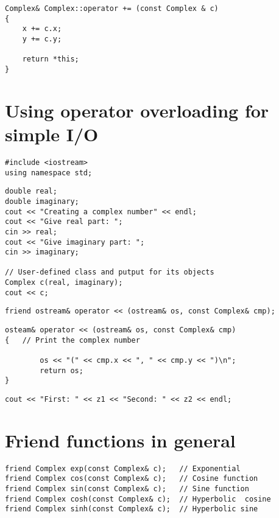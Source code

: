 \begin{lstlisting}
Complex& Complex::operator += (const Complex & c)
{
	x += c.x;
	y += c.y;

	return *this;
}
\end{lstlisting}

\section{Using operator overloading for simple I/O}

\begin{lstlisting}
#include <iostream>
using namespace std;
\end{lstlisting}

\begin{lstlisting}
double real;
double imaginary;
cout << "Creating a complex number" << endl;
cout << "Give real part: ";
cin >> real;
cout << "Give imaginary part: ";
cin >> imaginary;

// User-defined class and putput for its objects
Complex c(real, imaginary);
cout << c;
\end{lstlisting}

\begin{lstlisting}
friend ostream& operator << (ostream& os, const Complex& cmp);
\end{lstlisting}

\begin{lstlisting}
osteam& operator << (ostream& os, const Complex& cmp)
{	// Print the complex number

		os << "(" << cmp.x << ", " << cmp.y << ")\n";
		return os;
}
\end{lstlisting}

\begin{lstlisting}
cout << "First: " << z1 << "Second: " << z2 << endl;
\end{lstlisting}

\section{Friend functions in general}

\begin{lstlisting}
friend Complex exp(const Complex& c);	// Exponential
friend Complex cos(const Complex& c);	// Cosine function
friend Complex sin(const Complex& c);	// Sine function
friend Complex cosh(const Complex& c);	// Hyperbolic  cosine
friend Complex sinh(const Complex& c);	// Hyperbolic sine
\end{lstlisting}

